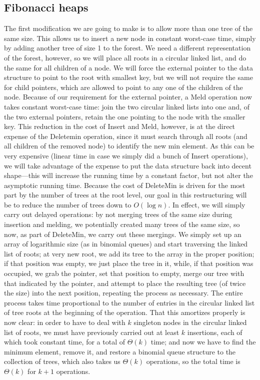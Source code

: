 \documentclass[11pt]{article}
\begin{document}
\subsection{Fibonacci heaps}
The first modification we are going to make is to allow more than one tree
of the same size.  This allows us to insert a new node in constant worst-case
time, simply by adding another tree of size 1 to the forest.  We need a
different representation of the forest, however, so we will place all roots
in a circular linked list, and do the same for all children of a node.
We will force the external pointer to the data structure to point to the root
with smallest key, but we will not require the same for child pointers,
which are allowed to point to any one of the children of the node.
Because of our requirement for the external pointer, a Meld operation
now takes constant worst-case time: join the two circular linked lists into
one and, of the two external pointers, retain the one pointing to the node
with the smaller key.
This reduction in the cost of Insert and Meld, however, is at the direct
expense of the Deletemin operation, since it must search through all roots
(and all children of the removed node) to identify the new min element.
As this can be very expensive (linear time in case we simply did a bunch of
Insert operations), we will take advantage of the expense to put the data
structure back into decent shape---this will increase the running time by
a constant factor,  but not alter the asymptotic running time.
Because the cost of DeleteMin is driven for the most part by the number of
trees at the root level, our goal in this restructuring will be to reduce
the number of trees down to $O(\log n)$.  In effect, we will simply carry out
delayed operations: by not merging trees of the same size during insertion and
melding, we potentially created many trees of the same size, so now, as part
of DeleteMin, we carry out these mergings.   We simply set up an array of
logarithmic size (as in binomial queues) and start traversing the linked list
of roots; at very new root, we add its tree to the array in the proper position;
if that position was empty, we just place the tree in it, while,
if that position was occupied, we grab the pointer, set that position to empty,
merge our tree with that indicated by the pointer, and attempt to place the
resulting tree (of twice the size) into the next position, repeating the process
as necessary.  The entire process takes time proportional to the number of
entries in the circular linked list of tree roots at the beginning of the
operation.  That this amortizes properly is now clear: in order to have
to deal with $k$ singleton nodes in the circular linked list of roots,
we must have previously carried out at least $k$ insertions, each of which
took constant time, for a total of $\Theta(k)$ time; and now we have to
find the minimum element, remove it, and restore a binomial queue structure
to the collection of trees, which also takes us $\Theta(k)$ operations,
so the total time is $\Theta(k)$ for $k+1$ operations.
\end{document}

